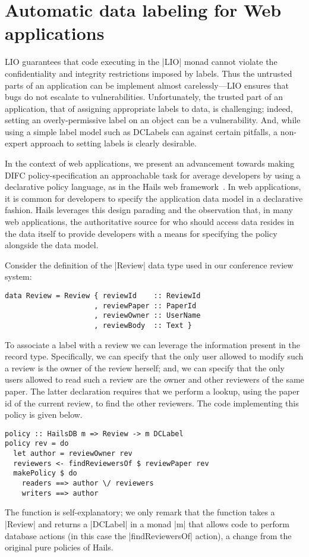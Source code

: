 \section{Automatic data labeling for Web applications}

LIO guarantees that code executing in the \hs|LIO| monad cannot
violate the confidentiality and integrity restrictions imposed by
labels.
%
Thus the untrusted parts of an application can be implement almost
carelessly---LIO ensures that bugs do not escalate to vulnerabilities.
%
Unfortunately, the trusted part of an application, that of assigning
appropriate labels to data, is challenging; indeed, setting an
overly-permissive label on an object can be a vulnerability.
%
And, while using a simple label model such as DCLabels can against
certain pitfalls, a non-expert approach to setting labels is clearly
desirable.

In the context of web applications, we present an advancement towards
making DIFC policy-specification an approachable task for average
developers by using a declarative policy language, as in the Hails web
framework~\cite{hails}.
%
In web applications, it is common for developers to specify the
application data model in a declarative fashion.
%
Hails leverages this design parading and the observation that, in many
web applications, the authoritative source for who should access data
resides in the data itself to provide developers with a means for
specifying the policy alongside the data model.
%

Consider the definition of the \hs|Review| data type used in our
conference review system:
\begin{verbatim}
data Review = Review { reviewId    :: ReviewId
                     , reviewPaper :: PaperId
                     , reviewOwner :: UserName
                     , reviewBody  :: Text }
\end{verbatim}
To associate a label with a review we can leverage the 
information present in the record type.
%
Specifically, we can specify that the only user allowed to modify such
a review is the owner of the review herself; and, we can specify that
the only users allowed to read such a review are the owner and other
reviewers of the same paper.
%
The latter declaration requires that we perform a lookup, using the
paper id of the current review, to find the other reviewers.
%
The code implementing this policy is given below.
%
\begin{verbatim}
policy :: HailsDB m => Review -> m DCLabel
policy rev = do
  let author = reviewOwner rev
  reviewers <- findReviewersOf $ reviewPaper rev
  makePolicy $ do
    readers ==> author \/ reviewers
    writers ==> author
\end{verbatim}
%
The function is self-explanatory; we only remark that the function
takes a \hs|Review| and returns a \hs|DCLabel| in a monad \hs|m| that
allows code to perform database actions (in this case the
\hs|findReviewersOf| action), a change from the original pure policies
of Hails.
%

